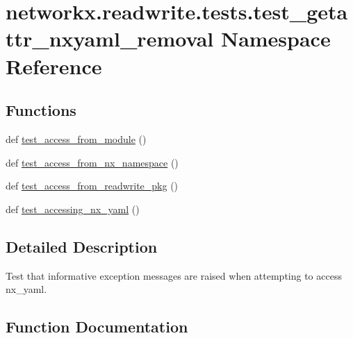 \hypertarget{namespacenetworkx_1_1readwrite_1_1tests_1_1test__getattr__nxyaml__removal}{}\section{networkx.\+readwrite.\+tests.\+test\+\_\+getattr\+\_\+nxyaml\+\_\+removal Namespace Reference}
\label{namespacenetworkx_1_1readwrite_1_1tests_1_1test__getattr__nxyaml__removal}
\subsection*{Functions}
\begin{DoxyCompactItemize}
\item 
def \hyperlink{namespacenetworkx_1_1readwrite_1_1tests_1_1test__getattr__nxyaml__removal_a56b442b79badaf40a123879cd1b23d1f}{test\+\_\+access\+\_\+from\+\_\+module} ()
\item 
def \hyperlink{namespacenetworkx_1_1readwrite_1_1tests_1_1test__getattr__nxyaml__removal_a5c944f63592042f39ee1cc628f325736}{test\+\_\+access\+\_\+from\+\_\+nx\+\_\+namespace} ()
\item 
def \hyperlink{namespacenetworkx_1_1readwrite_1_1tests_1_1test__getattr__nxyaml__removal_a322c7b936722655e20e0bbe088b01dfb}{test\+\_\+access\+\_\+from\+\_\+readwrite\+\_\+pkg} ()
\item 
def \hyperlink{namespacenetworkx_1_1readwrite_1_1tests_1_1test__getattr__nxyaml__removal_a5104a620c355fa05687607e3aabb9497}{test\+\_\+accessing\+\_\+nx\+\_\+yaml} ()
\end{DoxyCompactItemize}


\subsection{Detailed Description}
\begin{DoxyVerb}Test that informative exception messages are raised when attempting to
access nx_yaml.\end{DoxyVerb}
 

\subsection{Function Documentation}
\mbox{\label{namespacenetworkx_1_1readwrite_1_1tests_1_1test__getattr__nxyaml__removal_a56b442b79badaf40a123879cd1b23d1f}} 
